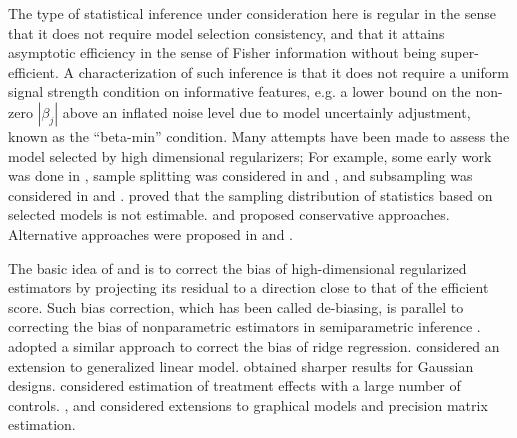 \documentclass[11pt,preprint]{imsart}
\numberwithin{equation}{section}
\theoremstyle{plain}
\theoremstyle{remark}
\theoremstyle{mystyle}
\begin{document}
The type of statistical inference under consideration here is regular in the sense that 
it does not require model selection consistency, and that it attains asymptotic efficiency 
in the sense of Fisher information without being super-efficient. 
A characterization of such inference is that it does not require a uniform signal strength 
condition on informative features, e.g. a lower bound on the non-zero $|\beta_j|$ 
above an inflated noise level due to model uncertainly adjustment, known as the ``beta-min'' condition. 
Many attempts have been made to assess the model selected by high dimensional regularizers; 
For example, some early work was done in \cite{KnightFu00}, 
sample splitting was considered in \cite{WasRoe09} and \cite{mein09}, 
and subsampling was considered in  \cite{mein10} and \cite{shah13}. 
\cite{LeebP06} proved that the sampling distribution of statistics based on selected models 
is not estimable. 
\cite{BerkBZ10} and \cite{LaberM11} proposed conservative approaches. 
Alternative approaches were proposed in \cite{Lockhart14} and \cite{Mein13}. 

The basic idea of \cite{Zhang2014} and \cite{ZhangOber11} 
is to correct the bias of high-dimensional regularized estimators by 
projecting its residual to a direction close to that of the efficient score. 
Such bias correction, which has been called de-biasing, is parallel to 
correcting the bias of nonparametric estimators in semiparametric inference \citep{BickelKRW98}. 
\cite{Buhl13} adopted a similar approach to correct the bias of ridge regression. 
\cite{VandeGeer2013} considered an extension to generalized linear model. 
\cite{Javanmard2013a} obtained sharper results for Gaussian designs. 
\cite{Belloni14} considered estimation of treatment effects with a large number of controls. 
\cite{SunZ12PartialCorr}, \cite{RSZZ12} and \cite{Jankova14} considered extensions to 
graphical models and precision matrix estimation. 
\end{document}
